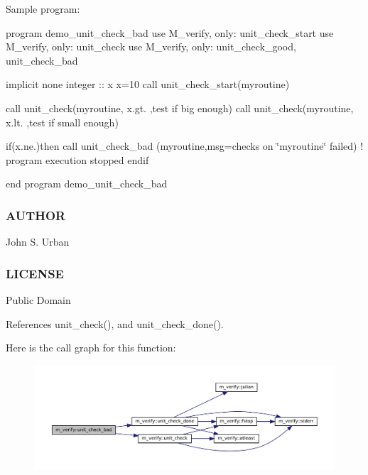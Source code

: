 Sample program\+:

program demo\+\_\+unit\+\_\+check\+\_\+bad use M\+\_\+verify, only\+: unit\+\_\+check\+\_\+start use M\+\_\+verify, only\+: unit\+\_\+check use M\+\_\+verify, only\+: unit\+\_\+check\+\_\+good, unit\+\_\+check\+\_\+bad

implicit none integer \+:\+: x x=10 call unit\+\_\+check\+\_\+start(\textquotesingle{}myroutine\textquotesingle{})

call unit\+\_\+check(\textquotesingle{}myroutine\textquotesingle{}, x.\+gt. ,\textquotesingle{}test if big enough\textquotesingle{}) call unit\+\_\+check(\textquotesingle{}myroutine\textquotesingle{}, x.\+lt. ,\textquotesingle{}test if small enough\textquotesingle{})

if(x.\+ne.)then call unit\+\_\+check\+\_\+bad (\textquotesingle{}myroutine\textquotesingle{},msg=\textquotesingle{}checks on \char`\"{}myroutine\char`\"{} failed\textquotesingle{}) ! program execution stopped endif

end program demo\+\_\+unit\+\_\+check\+\_\+bad

\subsubsection*{A\+U\+T\+H\+OR}

John S. Urban

\subsubsection*{L\+I\+C\+E\+N\+SE}

Public Domain 

References unit\+\_\+check(), and unit\+\_\+check\+\_\+done().

Here is the call graph for this function\+:\nopagebreak
\begin{figure}[H]
\begin{center}
\leavevmode
\includegraphics[width=350pt]{namespacem__verify_aaa2744e5ab1687072183869bd53cc086_cgraph}
\end{center}
\end{figure}
\mbox{\label{namespacem__verify_a0c0ed723b61b2cbbebb81fa91edd1941}} 
